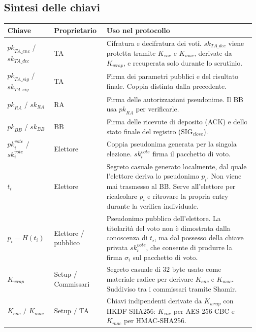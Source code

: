 \documentclass[12pt,a4paper]{article}
\newcommand{\pk}{\mathit{pk}}
\newcommand{\sk}{\mathit{sk}}
\begin{document}
\subsection{Sintesi delle chiavi}

\begin{small}
\begin{longtable}{>{\raggedright}p{2.5cm} >{\raggedright}p{2.5cm} p{8cm}}
\toprule
\textbf{Chiave} & \textbf{Proprietario} & \textbf{Uso nel protocollo} \\
\midrule
\endhead
$\pk_{\mathit{TA\_enc}}$ / $\sk_{\mathit{TA\_dec}}$ & TA &
Cifratura e decifratura dei voti. $\sk_{\mathit{TA\_dec}}$ viene protetta tramite $K_{\mathit{enc}}$ e $K_{\mathit{mac}}$, derivate da $K_{\mathit{wrap}}$, e recuperata solo durante lo scrutinio. \\
\midrule
$\pk_{\mathit{TA\_sig}}$ / $\sk_{\mathit{TA\_sig}}$ & TA &
Firma dei parametri pubblici e del risultato finale. Coppia distinta dalla precedente. \\
\midrule
$\pk_{\mathit{RA}}$ / $\sk_{\mathit{RA}}$ & RA &
Firma delle autorizzazioni pseudonime. Il BB usa $\pk_{\mathit{RA}}$ per verificarle. \\
\midrule
$\pk_{\mathit{BB}}$ / $\sk_{\mathit{BB}}$ & BB &
Firma delle ricevute di deposito (ACK) e dello stato finale del registro
($\mathrm{SIG}_{\mathit{close}}$).\\
\midrule
$\pk_i^{\mathit{vote}}$ / $\sk_i^{\mathit{vote}}$ & Elettore &
Coppia pseudonima generata per la singola elezione. $\sk_i^{\mathit{vote}}$ firma il pacchetto di voto. \\
\midrule
$t_i$ & Elettore &
Segreto casuale generato localmente, dal quale l'elettore deriva lo pseudonimo $p_i$. Non viene mai trasmesso al BB. Serve all'elettore per ricalcolare $p_i$ e ritrovare la propria entry durante la verifica individuale. \\
\midrule
$p_i = H(t_i)$ & Elettore / pubblico &
Pseudonimo pubblico dell'elettore. La titolarit\`a del voto non \`e dimostrata dalla conoscenza di $t_i$, ma dal possesso della chiave privata $\sk_i^{\mathit{vote}}$, che consente di produrre la firma $\sigma_i$ sul pacchetto di voto. \\
\midrule
$K_{\mathit{wrap}}$ & Setup / Commissari &
Segreto casuale di 32 byte usato come materiale radice per derivare $K_{\mathit{enc}}$ e $K_{\mathit{mac}}$. Suddiviso tra i commissari tramite Shamir. \\
\midrule
$K_{\mathit{enc}}$ / $K_{\mathit{mac}}$ & Setup / TA &
Chiavi indipendenti derivate da $K_{\mathit{wrap}}$ con HKDF-SHA256: $K_{\mathit{enc}}$ per AES-256-CBC e $K_{\mathit{mac}}$ per HMAC-SHA256. \\

\end{longtable}
\end{small}
\end{document}
